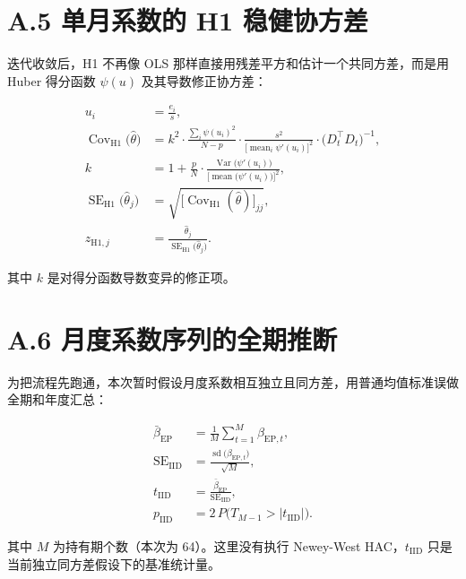 \documentclass[UTF8,a4paper,11pt]{ctexart}
\begin{document}
{}
\section*{A.5 单月系数的 H1 稳健协方差}

迭代收敛后，H1 不再像 OLS 那样直接用残差平方和估计一个共同方差，而是用 Huber 得分函数 $\psi(u)$ 及其导数修正协方差：

\begin{align}
u_i &= \frac{e_i}{s}, \\
\operatorname{Cov}_{\mathrm{H1}}\bigl(\hat{\theta}\bigr)
&= k^2 \cdot \frac{\sum_{i} \psi(u_i)^2}{N-p}
\cdot \frac{s^2}{\bigl[\operatorname{mean}_i \psi'(u_i)\bigr]^2}
\cdot \bigl(D_t^{\top} D_t\bigr)^{-1}, \\
k &= 1 + \frac{p}{N} \cdot
\frac{\operatorname{Var}\bigl(\psi'(u_i)\bigr)}{\bigl[\operatorname{mean}\bigl(\psi'(u_i)\bigr)\bigr]^2}, \\
\operatorname{SE}_{\mathrm{H1}}\bigl(\hat{\theta}_j\bigr)
&= \sqrt{\bigl[\operatorname{Cov}_{\mathrm{H1}}(\hat{\theta})\bigr]_{jj}}, \\
z_{\mathrm{H1},j} &= \frac{\hat{\theta}_j}{\operatorname{SE}_{\mathrm{H1}}\bigl(\hat{\theta}_j\bigr)}.
\end{align}

其中 $k$ 是对得分函数导数变异的修正项。

{}
\section*{A.6 月度系数序列的全期推断}

为把流程先跑通，本次暂时假设月度系数相互独立且同方差，用普通均值标准误做全期和年度汇总：

\begin{align}
\bar{\beta}_{\mathrm{EP}} &= \frac{1}{M} \sum_{t=1}^{M} \beta_{\mathrm{EP},t}, \\
\operatorname{SE}_{\mathrm{IID}} &= \frac{\operatorname{sd}\bigl(\beta_{\mathrm{EP},t}\bigr)}{\sqrt{M}}, \\
t_{\mathrm{IID}} &= \frac{\bar{\beta}_{\mathrm{EP}}}{\operatorname{SE}_{\mathrm{IID}}}, \\
p_{\mathrm{IID}} &= 2\, P\bigl(T_{M-1} > \vert t_{\mathrm{IID}} \vert\bigr).
\end{align}

其中 $M$ 为持有期个数（本次为 64）。这里没有执行 Newey-West HAC，$t_{\mathrm{IID}}$ 只是当前独立同方差假设下的基准统计量。
\end{document}
